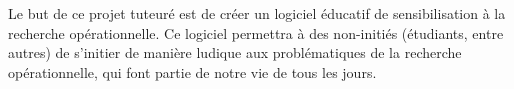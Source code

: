 \setcounter{footnote}{0}

Le but de ce projet tuteuré est de créer un logiciel éducatif de sensibilisation à la recherche
 opérationnelle. Ce logiciel permettra à des non-initiés (étudiants, entre autres) de s'initier
 de manière ludique aux problématiques de la recherche opérationnelle, qui font partie de notre
 vie de tous les jours.


